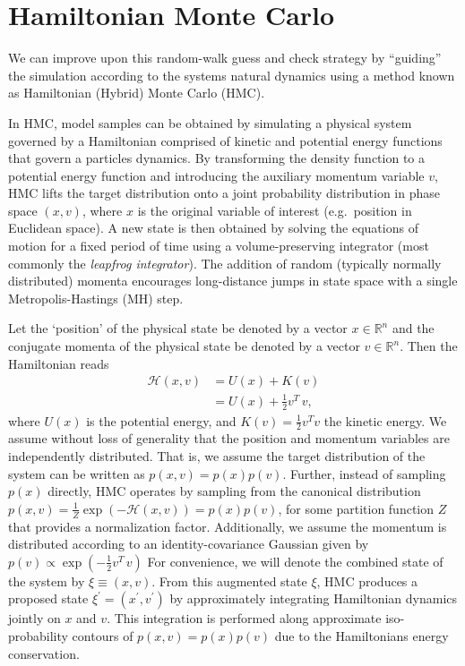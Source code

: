 \documentclass[../main.tex]{subfiles}
\begin{document}
\section{Hamiltonian Monte Carlo}%
\label{sec:l2hmc_hmc}
We can improve upon this random-walk guess and check strategy by ``guiding''
the simulation according to the systems natural dynamics using a method known
as Hamiltonian (Hybrid) Monte Carlo (HMC).

In HMC, model samples can be obtained by simulating a physical system governed
by a Hamiltonian comprised of kinetic and potential energy functions that
govern a particles dynamics.
%
By transforming the density function to a potential energy function and
introducing the auxiliary momentum variable $v$, HMC lifts the target
distribution onto a joint probability distribution in phase space $(x, v)$,
where $x$ is the original variable of interest (e.g.\ position in Euclidean
space).
%
A new state is then obtained by solving the equations of motion for a fixed
period of time using a volume-preserving integrator (most commonly the
\emph{leapfrog integrator}).
%
The addition of random (typically normally distributed) momenta encourages
long-distance jumps in state space with a single Metropolis-Hastings (MH) step.

Let the `position' of the physical state be denoted by a vector $x
\in\mathbb{R}^{n}$ and the conjugate momenta of the physical state be denoted
by a vector $v \in\mathbb{R}^{n}$.
%
Then the Hamiltonian reads
%
\begin{align}
    \mathcal{H}(x, v) &= U(x) + K(v)\\
                      & = U(x) + \frac{1}{2} v^{T} \,v,
    \label{eq:hamiltonian}
\end{align}
%
where $U(x)$ is the potential energy, and $K(v)=\frac{1}{2}v^{T}v$ the kinetic
energy.  
%
We assume without loss of generality that the position and momentum variables
are independently distributed.  
%
That is, we assume the target distribution of the system can be written as
$p(x, v) = p(x) p(v)$.  
%
Further, instead of sampling $p(x)$ directly, HMC operates by sampling from the
canonical distribution $p(x, v) = \frac{1}{Z} \exp(-\mathcal{H}(x, v)) = p(x)
p(v)$, for some partition function $Z$ that provides a normalization factor.
%
Additionally, we assume the momentum is distributed according to an
identity-covariance Gaussian given by $p(v) \propto \exp{(-\frac{1}{2} v^{T} \,
v)}$ For convenience, we will denote the combined state of the system by $\xi
\equiv (x, v)$.
%
From this augmented state $\xi$, HMC produces a proposed state $\xi^{\prime} =
(x^{\prime}, v^{\prime})$ by approximately integrating Hamiltonian dynamics
jointly on $x$ and $v$.
%
This integration is performed along approximate iso-probability contours of
$p(x, v) = p(x) p(v)$ due to the Hamiltonians energy conservation.
%
\end{document}

